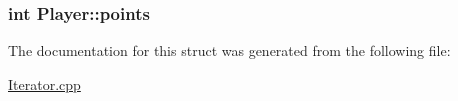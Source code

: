 \subsubsection[{\texorpdfstring{points}{points}}]{\setlength{\rightskip}{0pt plus 5cm}int Player\+::points}\hypertarget{structPlayer_adf0398ea8c1f29175204508ab642b64e}{}\label{structPlayer_adf0398ea8c1f29175204508ab642b64e}


The documentation for this struct was generated from the following file\+:\begin{DoxyCompactItemize}
\item 
\hyperlink{Iterator_8cpp}{Iterator.\+cpp}\end{DoxyCompactItemize}

